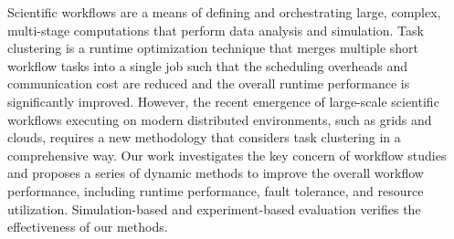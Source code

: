 Scientific workflows are a means of defining and orchestrating large, complex, multi-stage computations that perform data analysis and simulation. Task clustering is a runtime optimization technique that merges multiple short workflow tasks into a single job such that the scheduling overheads and communication cost are reduced and the overall runtime performance is significantly improved. However, the recent emergence of large-scale scientific workflows executing on modern distributed environments, such as grids and clouds, requires a new methodology that considers task clustering in a comprehensive way. Our work investigates the key concern of workflow studies and proposes a series of dynamic methods to improve the overall workflow performance, including runtime performance, fault tolerance, and resource utilization. Simulation-based and experiment-based evaluation verifies the effectiveness of our methods. 



